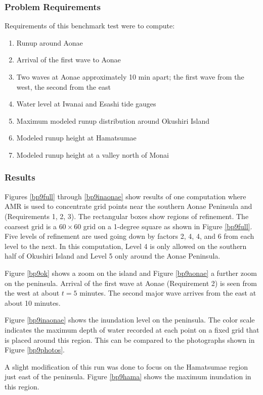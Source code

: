 \subsubsection{Problem Requirements}
  Requirements of this benchmark test were to compute:
\begin{enumerate}
\item  Runup around Aonae
\item  Arrival of the first wave to Aonae
\item  Two waves at Aonae approximately 10 min apart; the first wave from the west, the second from the east
\item  Water level at Iwanai and Esashi tide gauges
\item  Maximum modeled runup distribution around Okushiri Island
\item  Modeled runup height at Hamatsumae
\item  Modeled runup height at a valley north of Monai
\end{enumerate}

\subsubsection{Results}

Figures \ref{bp9full} through  \ref{bp9inaonae} show results of one computation where AMR is used to concentrate grid points near the southern Aonae Peninsula and  (Requirements 1, 2, 3). The rectangular boxes show regions of refinement.  The coarsest grid is a $60\times 60$ grid on a 1-degree square as shown in Figure \ref{bp9full}. Five levels of refinement are used going down by factors 2, 4, 4, and 6 from each level to the next. In this computation, Level 4 is only allowed on the southern half of Okushiri Island and Level 5 only around the Aonae Peninsula. 

Figure \ref{bp9ok} shows a zoom on the island and Figure \ref{bp9aonae} a further zoom on the peninsula.  Arrival of the first wave at Aonae (Requirement 2) is seen from the west at about $t = 5$ minutes.  The second major wave arrives from the east at about 10 minutes.    

Figure \ref{bp9inaonae} shows the inundation level on the peninsula.  The color scale indicates the maximum depth of water recorded at each point on a fixed grid that is placed around this region.  This can be compared to the photographs shown in Figure \ref{bp9photos}.

A slight modification of this run was done to focus on the Hamatsumae  region just east of the peninsula.  Figure \ref{bp9hama} shows the maximum inundation in this region.


